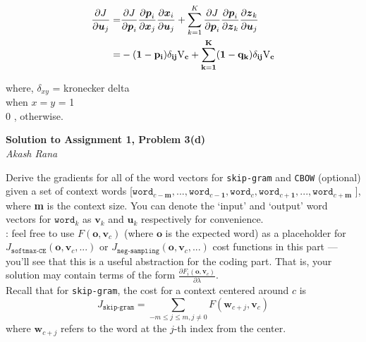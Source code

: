 \documentclass[letter,12pt]{article}
\newcommand{\myhwtitle}[3]
{\begin{center}
{\large {\bf Solution to Assignment {#1}, Problem {#2}}}\\
\medskip
{\it {#3}} %
\end{center}}
\newcommand{\solutionsAuthor}{Akash Rana}
\begin{document}
\begin{align}
\frac{\partial J}{\partial{\boldsymbol u}_{j}} = &\frac{\partial J}{\partial{{\boldsymbol p}_{i}}}\frac{\partial{{\boldsymbol p}_{i}}}{\partial{\boldsymbol x}_{j}}\frac{\partial{{\boldsymbol x}_{i}}}{\partial{\boldsymbol u}_{j}} + \sum^{{K}}_{k=1}\frac{\partial J}{\partial{{\boldsymbol p}_{i}}}\frac{\partial{{\boldsymbol p}_{i}}}{\partial{\boldsymbol z}_{k}}\frac{\partial{{\boldsymbol z}_{k}}}{\partial{\boldsymbol u}_{j}}\\
= &-(\bf{1- \bf{p}_{i}}){\bf \delta_{ij} \textrm{V}_{c}} + \sum^{{K}}_{k=1}(\bf{1- \bf{q}_{k}}){\bf\delta_{ij} \textrm{V}_{c}}                                                              
\end{align}
                    
where, $\delta_{xy}$ = kronecker delta \\
when $ {x = y} $ = 1 \\
0 , otherwise. 


\clearpage
\myhwtitle{1}{3(d)}{\solutionsAuthor}
\bigskip
\noindent Derive the gradients for all of the word vectors for \texttt{skip-gram} and \texttt{CBOW} (optional)
given a set of context words [$\texttt{word}_{c-\textbf{m}},...,\texttt{word}_{c-\textbf{1}},\texttt{word}_{c},\texttt{word}_{c+\textbf{1}},...,\texttt{word}_{c+\textbf{m}}$ ], where \textbf{m} is the context size. You can denote 
the `input' and `output' word vectors for $\texttt{word}_{k}$ as ${\boldsymbol v}_{k}$ and ${\boldsymbol u}_{k}$ respectively for
convenience. \\

: feel free to use $F({\boldsymbol o}, {\boldsymbol v}_{c})$ (where ${\boldsymbol o}$ is the expected word) as a placeholder for $J_{\texttt{softmax-CE}}({\boldsymbol o}, {\boldsymbol v}_{c}, ...)$ or $J_{\texttt{neg-sampling}}({\boldsymbol o}, {\boldsymbol v}_{c}, ...)$ cost functions in this part --- you'll see that this is a useful abstraction for the coding part. That is, your solution may contain terms of the form $\frac{\partial{F_{i}({\boldsymbol o}, {\boldsymbol v}_{c})}}{\partial\lambda}$.\\

\noindent Recall that for \texttt{skip-gram}, the cost for a context centered around $c$ is
\begin{equation}
J_{\texttt{skip-gram}} =   \sum_{-m\le j\le m, j\neq0}F({\boldsymbol w}_{c+j}, {\boldsymbol v}_{c})
\end{equation}
where ${\boldsymbol w}_{c+j}$ refers to the word at the $j$-th index from the center.\\
\end{document}
